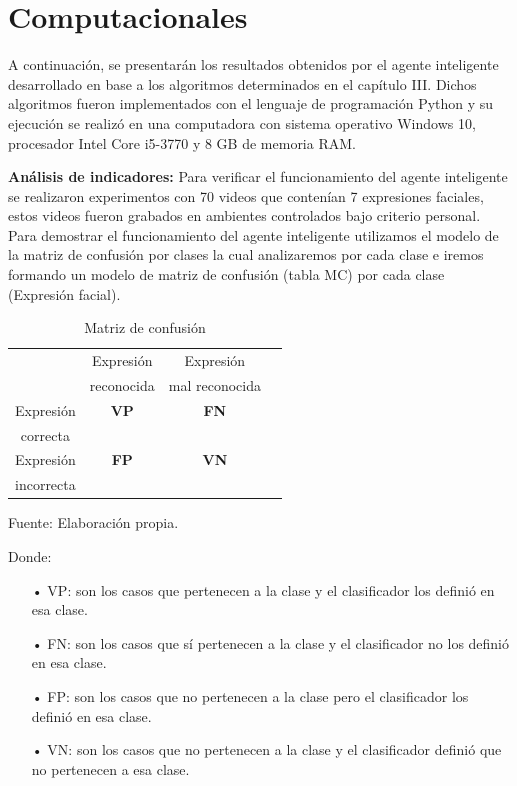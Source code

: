 \vskip 7cm

\section{Computacionales}

A continuación, se presentarán los resultados obtenidos por el agente inteligente desarrollado en base a los algoritmos determinados en el capítulo III. Dichos algoritmos fueron implementados con el lenguaje de programación Python y su ejecución se realizó en una computadora con sistema operativo Windows 10, procesador Intel Core i5-3770 y 8 GB de memoria RAM. \vskip 0.1cm

{\bf Análisis de indicadores:} \vskip 0.1cm
Para verificar el funcionamiento del agente inteligente se realizaron experimentos con 70 videos que contenían 7 expresiones faciales, estos videos fueron grabados en ambientes controlados bajo criterio personal.
\vskip 0.1cm
Para demostrar el funcionamiento del agente inteligente utilizamos el modelo de la matriz de confusión por clases la cual analizaremos por cada clase e iremos formando un modelo de matriz de confusión (tabla MC) por cada clase (Expresión facial).

\begin{table}[ht!]
\centering
\caption{Matriz de confusión} \vskip 0.1cm
\begin{tabular}{|c|c|c|c|} \hline
 & Expresión \par & Expresión \par \\
& reconocida & mal reconocida\\ \hline
Expresión \par & \bf VP & \bf FN \\ 
correcta & & \\ \hline 
Expresión \par & \bf FP & \bf VN \\ 
incorrecta & & \\ \hline 
\end{tabular}
\begin{center}
{\small{Fuente: Elaboración propia.}}
\end{center}
\end{table}

Donde: \vskip 0.1cm

\begin{itemize}
\item[•] VP: son los casos que pertenecen a la clase y el clasificador los definió en esa clase. 
\item[•] FN: son los casos que sí pertenecen a la clase y el clasificador no los definió en esa clase. 
\item[•] FP: son los casos que no pertenecen a la clase pero el clasificador los definió en esa clase. 
\item[•] VN: son los casos que no pertenecen a la clase y el clasificador definió que no pertenecen a esa clase.
\end{itemize}

